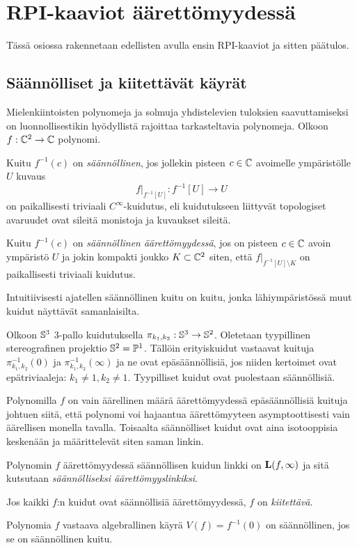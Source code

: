 \section{RPI-kaaviot äärettömyydessä}
Tässä osiossa rakennetaan edellisten avulla ensin RPI-kaaviot ja sitten päätulos.

\subsection{Säännölliset ja kiitettävät käyrät}
Mielenkiintoisten polynomeja ja solmuja yhdistelevien tuloksien saavuttamiseksi on luonnollisestikin hyödyllistä rajoittaa tarkasteltavia polynomeja. Olkoon $f:\C^2\to\C$ polynomi.
\begin{maaritelma}
    Kuitu $f^{-1}(c)$ on \emph{säännöllinen}, jos jollekin pisteen $c\in\C$ avoimelle ympäristölle $U$ kuvaus
    \begin{equation*}
        f\vert_{f^{-1}[U]}:f^{-1}[U]\to U
    \end{equation*}
    on paikallisesti triviaali $C^\infty$-kuidutus, eli kuidutukseen liittyvät topologiset avaruudet ovat sileitä monistoja ja kuvaukset sileitä.
\end{maaritelma}
\begin{maaritelma}
    Kuitu $f^{-1}(c)$ on \emph{säännöllinen äärettömyydessä}, jos on pisteen $c\in\C$ avoin ympäristö $U$ ja jokin kompakti joukko $K\subset\C^2$ siten, että $f\vert_{f^{-1}[U]\setminus K}$ on paikallisesti triviaali kuidutus.
\end{maaritelma}
Intuitiivisesti ajatellen säännöllinen kuitu on kuitu, jonka lähiympäristössä muut kuidut näyttävät samanlaisilta.
\begin{esimerkki}
    Olkoon $\S^3$ 3-pallo kuidutuksella $\pi_{k_1,k_2}:\S^3\to\S^2$. Oletetaan tyypillinen stereografinen projektio $\S^2=\P^1$. Tällöin erityiskuidut vastaavat kuituja $\pi_{k_1,k_2}^{-1}(0)$ ja $\pi_{k_1,k_2}^{-1}(\infty)$ ja ne ovat epäsäännöllisiä, jos niiden kertoimet ovat epätriviaaleja: $k_1\ne1,k_2\ne1$. Tyypilliset kuidut ovat puolestaan säännöllisiä.
\end{esimerkki}
Polynomilla $f$ on vain äärellinen määrä äärettömyydessä epäsäännöllisiä kuituja johtuen siitä, että polynomi voi hajaantua äärettömyyteen asymptoottisesti vain äärellisen monella tavalla. Toisaalta säännölliset kuidut ovat aina isotooppisia keskenään ja määrittelevät siten saman linkin.
\begin{maaritelma}
    Polynomin $f$ äärettömyydessä säännöllisen kuidun linkki on $\linkki(f,\infty)$ ja sitä kutsutaan \emph{säännölliseksi äärettömyyslinkiksi}.
\end{maaritelma}
\begin{maaritelma}
    Jos kaikki $f$:n kuidut ovat säännöllisiä äärettömyydessä, $f$ on \emph{kiitettävä}.
\end{maaritelma}
\begin{maaritelma}
    Polynomia $f$ vastaava algebrallinen käyrä $V(f)=f^{-1}(0)$ on säännöllinen, jos se on säännöllinen kuitu.
\end{maaritelma}

